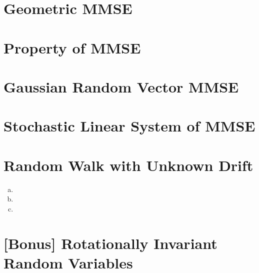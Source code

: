 \documentclass[11pt]{article}
\begin{document}
\section{Geometric MMSE}

\section{Property of MMSE}

\section{Gaussian Random Vector MMSE}

\section{Stochastic Linear System of MMSE}

\section{Random Walk with Unknown Drift}
\begin{enumerate}[(a)]
    \item

    \item
    
    \item
\end{enumerate}

\section{[Bonus] Rotationally Invariant Random Variables}

\clearpage
\end{document}
